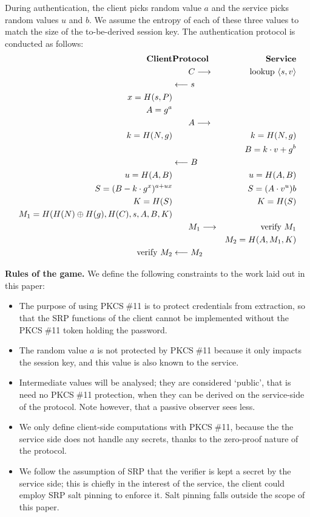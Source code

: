 \documentclass[a4paper,11pt]{article}
\def\pkcs11{PKCS$\;$\#11\xspace}
\def\tol#1{\longleftarrow\strut{}#1\strut\phantom{\longrightarrow}}
\def\tor#1{\phantom{\longleftarrow\strut}#1\strut\longrightarrow}
\begin{document}
During authentication, the client picks random value $a$ and the service picks random values $u$ and $b$.  We assume the entropy of each of these three values to match the size of the to-be-derived session key.  The authentication protocol is conducted as follows:
%
\begin{eqnarray*}
\textbf{Client}&\textbf{Protocol}&\textbf{Service}\\
&\tor{C}&\textrm{lookup $\langle s,v\rangle$}\\
&\tol{s}&\\
x=H(s,P)&&\\
A=g^a&&\\
& \tor{A}&\\
k=H(N,g)&&k=H(N,g)\\
&&B=k\cdot v+g^b\\
&\tol{B}&\\
u=H(A,B)&&u=H(A,B)\\
S=(B-k\cdot g^x)^{a+ux} && S=(A\cdot v^u)b\\
K=H(S)&&K=H(S)\\
M_1=H(H(N)\oplus H(g),H(C),s,A,B,K)&&\\
&\tor{M_1}&\textrm{verify $M_1$}\\
&&M_2=H(A,M_1,K)\\
\textrm{verify $M_2$}&\tol{M_2}&
\end{eqnarray*}



\textbf{Rules of the game.}  We define the following constraints to the work laid out in this paper:
\begin{itemize}
\item The purpose of using \pkcs11 is to protect credentials from extraction, so that the SRP functions of the client cannot be implemented without the \pkcs11 token holding the password.
\item The random value $a$ is not protected by \pkcs11 because it only impacts the session key, and this value is also known to the service.
\item Intermediate values will be analysed; they are considered `public', that is need no \pkcs11 protection, when they can be derived on the service-side of the protocol.  Note however, that a passive observer sees less.
\item We only define client-side computations with \pkcs11, because the the service side does not handle any secrets, thanks to the zero-proof nature of the protocol.
\item We follow the assumption of SRP that the verifier is kept a secret by the service side; this is chiefly in the interest of the service, the client could employ SRP salt pinning to enforce it.  Salt pinning falls outside the scope of this paper.
\end{itemize}
\end{document}
